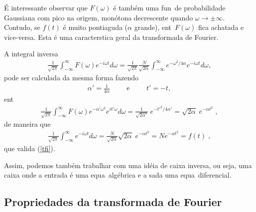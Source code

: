 \'E interessante observar que $F(\omega)$ \'e tamb\'em uma fun\cao\
de probabilidade Gaussiana com pico na origem, mon\'otona decrescente
quando $\omega \longrightarrow \pm \infty$. Contudo, se $f(t)$ \'e
muito pontiaguda ($\alpha$ grande), ent\ao\ $F(\omega)$ fica achatada
e vice-versa. Esta \'e uma caracter\ih stica geral da transformada
de Fourier.

A integral inversa
\begin{eqnarray}
\frac{1}{\sqrt{2\pi}}\int_{-\infty}^{\infty} F(\omega)
e^{-i \omega t} d\omega = \frac{1}{\sqrt{2\pi}} \frac{N}{\sqrt{2\alpha}}
\int_{-\infty}^{\infty} e^{-\omega^2/4\alpha} e^{-i \omega t} d\omega,
\end{eqnarray}
pode ser calculada da mesma forma fazendo
\begin{eqnarray}
\alpha' = \frac{1}{4\alpha} \hspace{1cm} \mbox{e} \hspace{1cm} t' = - t, 
\end{eqnarray}
ent\ao\
\begin{eqnarray}
\frac{1}{\sqrt{2\pi}}\int_{-\infty}^{\infty} F(\omega)
e^{-\alpha' \omega^2} e^{i t' \omega} d\omega =
\frac{1}{\sqrt{2\alpha'}} \; e^{-t'^2/4\alpha'} = \sqrt{2 \alpha} \;
e^{-\alpha t^2} \; ,
\end{eqnarray}
de maneira que
\begin{eqnarray}
\frac{1}{\sqrt{2\pi}} \int_{-\infty}^{\infty} 
e^{-i \omega t} d\omega = \frac{N}{\sqrt{2\alpha}} \sqrt{2\alpha} \;
e^{-\alpha t^2} = N e^{-\alpha t^2} = f(t) \; , 
\end{eqnarray}
que valida (\ref{tfi}).

Assim, podemos tamb\'em trabalhar com uma id\'eia de caixa inversa,
ou seja, uma caixa onde a entrada \'e uma equa\cao\ alg\'ebrica e
a sa\ih da uma equa\cao\ diferencial.


\subsection{Propriedades da transformada de Fourier}


